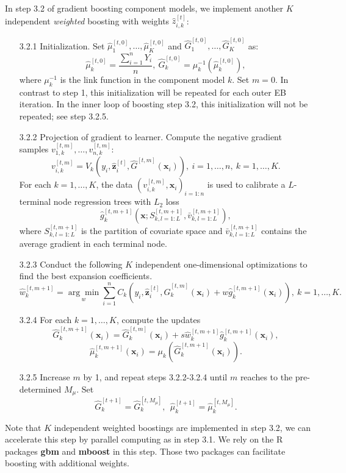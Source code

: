 \documentclass[11pt]{article}
\numberwithin{equation}{section}
\def\bx{\boldsymbol{x}}
\def\bz{\boldsymbol{z}}
\newcounter{saveenumi}
\newcommand{\seti}{\setcounter{saveenumi}{\value{enumi}}}
\begin{document}
In step 3.2 of gradient boosting component models, we implement another $K$ independent {\it weighted} boosting with weights $\hat{z}_{i,k}^{[t]}$:
	\begin{enumerate}
		\item[3.2.1] Initialization. Set $\hat{\mu}_1^{[t,0]},\ldots,\hat{\mu}_K^{[t,0]}$ and $\hat{G}_1^{[t,0]},\ldots,\hat{G}_K^{[t,0]}$ as:
			\begin{equation}\label{ini-2}
				\hat{\mu}_k^{[t,0]}=\frac{\sum_{i=1}^nY_i}{n},~ \hat{G}_k^{[t,0]}=\mu_k^{-1}(\hat{\mu}_k^{[t,0]}),
					\end{equation}
		where $\mu^{-1}_k$ is the link function in the component model $k$. 
		Set $m=0$.
		In contrast to step 1, this initialization will be repeated for each outer EB iteration.
		In the inner loop of boosting step 3.2, this initialization will not be repeated; see step 3.2.5. 
		\item[3.2.2] Projection of gradient to learner.
		Compute the negative gradient samples $v_{1,k}^{[t,m]},\ldots,v_{n,k}^{[t,m]}$: 
		$$v_{i,k}^{[t,m]}=V_k(y_i,\hat{\bz}^{[t]}_{i},\hat{G}^{[t,m]}(\bx_i)),~ i=1,\ldots,n, ~k=1,\ldots,K.$$
		For each $k=1,\ldots,K$, the data $(v_{i,k}^{[t,m]},\bx_i)_{i=1:n}$ is used to calibrate a $L$-terminal node regression trees with $L_2$ loss $$\hat{g}_k^{[t,m+1]}\left(\bx;S^{[t,m+1]}_{k,l=1:L},\bar{v}^{[t,m+1]}_{k,l=1:L}\right),$$
		 where $S^{[t,m+1]}_{k,l=1:L}$ is the partition of covariate space and $\bar{v}^{[t,m+1]}_{k,l=1:L}$ contains the average gradient in each terminal node.
		
		\item[3.2.3]  Conduct the following $K$ independent one-dimensional optimizations to find the best expansion coefficients.
		$$\hat{w}_{k}^{[t,m+1]}=\underset{w}{\arg\min}\sum_{i=1}^n C_{k}(y_i,\hat{\bz}_i^{[t]},\hat{G}_k^{[t,m]}(\bx_i)+w\hat{g}_k^{[t,m+1]}(\bx_i)), ~ k=1,\ldots,K.$$
		
		\item[3.2.4]  For each $k=1,\ldots,K$, compute the updates
		$$\hat{G}_k^{[t,m+1]}(\bx_i)=\hat{G}_k^{[t,m]}(\bx_i)+s\hat{w}_{k}^{[t,m+1]}\hat{g}_{k}^{[t,m+1]}(\bx_i),$$
		$$\hat{\mu}_k^{[t,m+1]}(\bx_i)=\mu_k(\hat{G}_k^{[t,m+1]}(\bx_i)).$$
		\seti


		\item[3.2.5] Increase $m$ by 1, and repeat steps 3.2.2-3.2.4 until $m$ reaches to the pre-determined $M_\mu$. Set
		$$\hat{G}_k^{[t+1]}=\hat{G}_k^{[t,M_\mu]},~~\hat{\mu}_k^{[t+1]}=\hat{\mu}_k^{[t,M_\mu]}.$$
	\end{enumerate}
Note that $K$ independent weighted boostings are implemented in step 3.2, we can accelerate this step by parallel computing as in step 3.1.
We rely on the R packages {\bf gbm} and {\bf mboost} in this step. 
Those two packages can facilitate boosting with additional weights.
\end{document}
